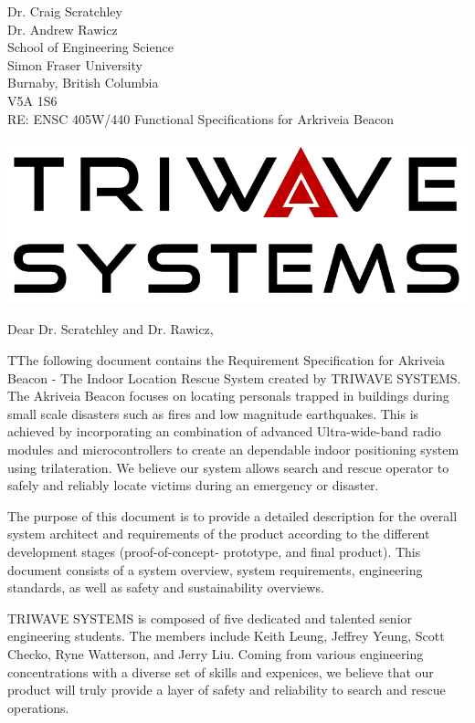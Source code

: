 \documentclass[11pt]{letter}
\date{June 09, 2019}
\begin{document}
\begin{letter}{
Dr. Craig Scratchley\\
Dr. Andrew Rawicz\\
School of Engineering Science\\
Simon Fraser University\\
Burnaby, British Columbia\\
V5A 1S6\\
\bigskip
RE: ENSC 405W/440 Functional Specifications for Arkriveia Beacon\\
} 


\begin{center}
\includegraphics[scale=0.25]{./images/logo_W.png}
\end{center}


\opening{Dear Dr. Scratchley and Dr. Rawicz,} 
 
\medskip
TThe following document contains the Requirement Specification for Akriveia Beacon - The Indoor Location Rescue System created by TRIWAVE SYSTEMS. The Akriveia Beacon focuses on locating personals trapped in buildings during small scale disasters such as fires and low magnitude earthquakes. This is achieved by incorporating an combination of advanced Ultra-wide-band radio modules and microcontrollers to create an dependable indoor positioning system using trilateration. We believe our system allows search and rescue operator to safely and reliably locate victims during an emergency or disaster.

\medskip
The purpose of this document is to provide a detailed description for the overall system architect and requirements of the product according to the different development stages (proof-of-concept- prototype, and final product). This document consists of a system overview, system requirements, engineering standards, as well as safety and sustainability overviews.

\medskip
TRIWAVE SYSTEMS is composed of five dedicated and talented senior engineering students. The members include Keith Leung, Jeffrey Yeung, Scott Checko, Ryne Watterson, and Jerry Liu. Coming from various engineering concentrations with a diverse set of skills and expenices, we believe that our product will truly provide a layer of safety and reliability to search and rescue operations.


\end{letter}
\end{document}
